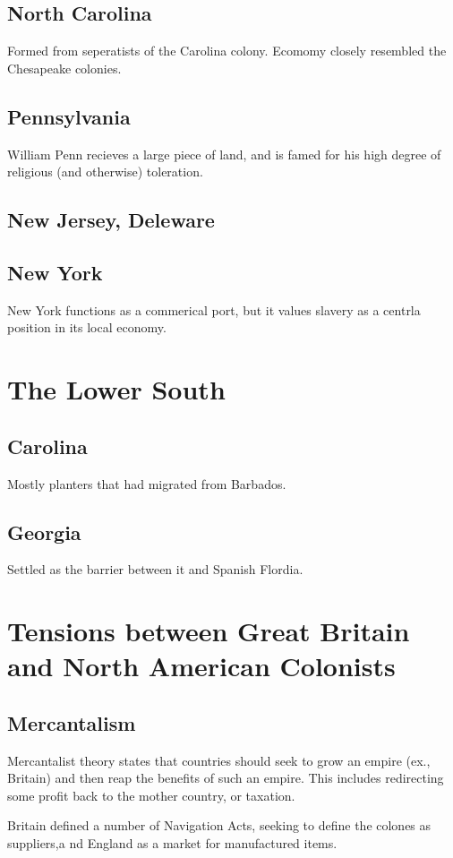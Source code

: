 \subsection{North Carolina}
Formed from seperatists of the Carolina colony.  Ecomomy closely resembled the
Chesapeake colonies.

\subsection{Pennsylvania}
William Penn recieves a large piece of land, and is famed for his high degree of
religious (and otherwise) toleration.

\subsection{New Jersey, Deleware}

\subsection{New York}
New York functions as a commerical port, but it values slavery as a centrla
position in its local economy.

\section{The Lower South}
\subsection{Carolina}
Mostly planters that had migrated from Barbados.

\subsection{Georgia}
Settled as the barrier between it and Spanish Flordia.

\section{Tensions between Great Britain and North American Colonists}
\subsection{Mercantalism}
Mercantalist theory states that countries should seek to grow an empire (ex.,
Britain) and then reap the benefits of such an empire.  This includes
redirecting some profit back to the mother country, or taxation.

Britain defined a number of Navigation Acts, seeking to define the colones as
suppliers,a nd England as a market for manufactured items.
